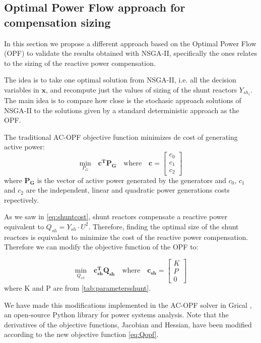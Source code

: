 \documentclass[a4paper,11pt, titlepage, twoside]{article}
\begin{document}
\subsection{Optimal Power Flow approach for compensation sizing}

In this section we propose a different approach based on the Optimal Power Flow (OPF) to validate the results obtained with NSGA-II, specifically the ones relates to
the sizing of the reactive power compensation.\par 

The idea is to take one optimal solution from NSGA-II, i.e. all the decision variables in $\mathbf{x}$, and recompute just the values of sizing of the shunt reactors $Y_{sh_i}$. The main idea is to compare how close is the 
stochasic approach solutions of NSGA-II to the solutions given by a standard deterministic approach as the OPF. \par


The traditional AC-OPF objective function \cite{opfnotes} minimizes de cost of generating active power:
\begin{equation}
    \underset{P_G}{\text{min}} \quad \mathbf{c^T} \mathbf{P_G} \quad \text{where} \quad \mathbf{c} = \begin{bmatrix} c_0 \\ c_1 \\ c_2 \end{bmatrix}
\end{equation}
where $\mathbf{P_G}$ is the vector of active power generated by the generators and $c_0$, $c_1$ and $c_2$ are the independent, linear and quadratic power generations costs repectively.

As we saw in \ref{eq:shuntcost}, shunt reactors compensate a reactive power equivalent to $Q_{sh} = Y_{sh} \cdot U^2$. Therefore, finding the optimal size of the shunt reactors is equivalent
to minimize the cost of the reactive power compensation. Therefore we can modify the objective function of the OPF to:

\begin{equation}\label{eq:Qopf}
\underset{Q_{sh}}{\text{min}} \quad \mathbf{c_{sh}^T} \mathbf{Q_{sh}} \quad \text{where} \quad \mathbf{c_{sh}} = \begin{bmatrix} K \\ P \\ 0 \end{bmatrix}
\end{equation}
where K and P are from \ref{tab:parametersshunt}.\par
We have made this modifications implemented in the AC-OPF solver in Grical \cite{gridcal}, an open-source Python library for power systems analysis. Note that the derivatives of the objective functions, Jacobian and Hessian, have
been modified according to the new objective function \ref{eq:Qopf}.
\end{document}
